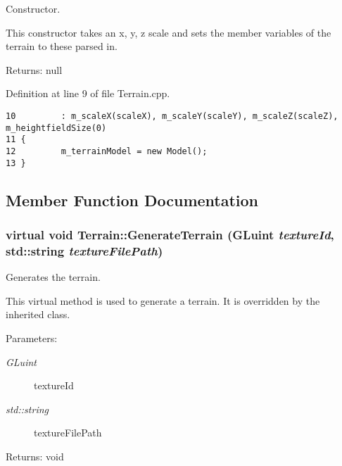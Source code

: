 Constructor. 

This constructor takes an x, y, z scale and sets the member variables of the terrain to these parsed in.

\begin{Desc}
\item[Returns:]null \end{Desc}


Definition at line 9 of file Terrain.cpp.

\begin{Code}\begin{verbatim}10         : m_scaleX(scaleX), m_scaleY(scaleY), m_scaleZ(scaleZ), m_heightfieldSize(0)
11 {
12         m_terrainModel = new Model();
13 }\end{verbatim}
\end{Code}




\subsection{Member Function Documentation}
\hypertarget{class_terrain_93fa5e9433a77d8f8bbe2a2f6aadf2ab}{
\subsubsection[GenerateTerrain]{\setlength{\rightskip}{0pt plus 5cm}virtual void Terrain::GenerateTerrain (GLuint {\em textureId}, \/  std::string {\em textureFilePath})}}
\label{class_terrain_93fa5e9433a77d8f8bbe2a2f6aadf2ab}


Generates the terrain. 

This virtual method is used to generate a terrain. It is overridden by the inherited class.

\begin{Desc}
\item[Parameters:]
\begin{description}
\item[{\em GLuint}]textureId \item[{\em std::string}]textureFilePath \end{description}
\end{Desc}
\begin{Desc}
\item[Returns:]void \end{Desc}



